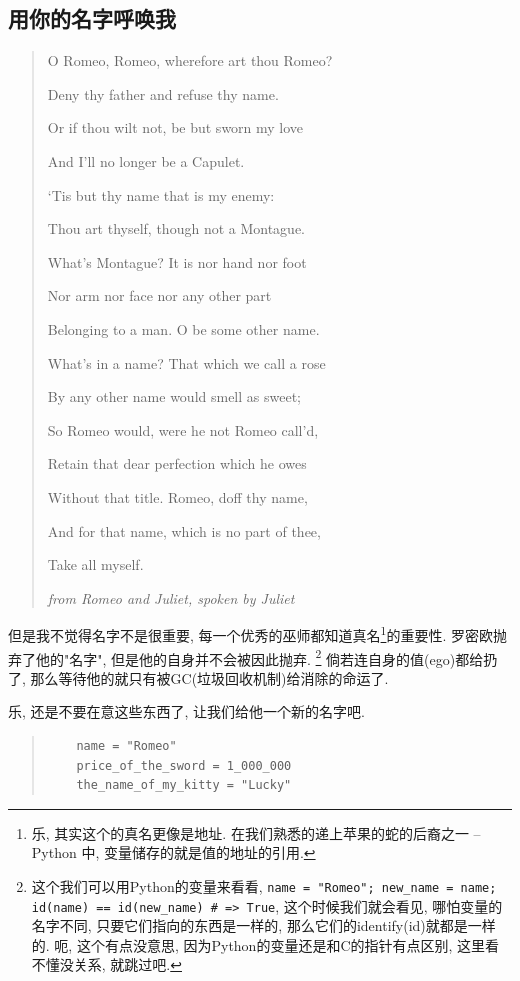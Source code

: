 \subsection{用你的名字呼唤我}
\begin{quotation}
  O Romeo, Romeo, wherefore art thou Romeo?

  Deny thy father and refuse thy name.

  Or if thou wilt not, be but sworn my love

  And I'll no longer be a Capulet.

  `Tis but thy name that is my enemy:

  Thou art thyself, though not a Montague.

  What's Montague? It is nor hand nor foot

  Nor arm nor face nor any other part

  Belonging to a man. O be some other name.

  What's in a name? That which we call a rose

  By any other name would smell as sweet;

  So Romeo would, were he not Romeo call'd,

  Retain that dear perfection which he owes

  Without that title. Romeo, doff thy name,

  And for that name, which is no part of thee,

  Take all myself.

  \emph{from Romeo and Juliet, spoken by Juliet}
\end{quotation}

但是我不觉得名字不是很重要, 每一个优秀的巫师都知道真名\footnote{乐, 其实这个的真名更像是地址. 在我们熟悉的递上苹果的蛇的后裔之一 -- Python 中, 变量储存的就是值的地址的引用. }的重要性. 罗密欧抛弃了他的"名字", 但是他的自身并不会被因此抛弃. \footnote{这个我们可以用Python的变量来看看, \texttt{name = "Romeo"; new_name = name; id(name) == id(new_name) # => True}, 这个时候我们就会看见, 哪怕变量的名字不同, 只要它们指向的东西是一样的, 那么它们的identify(id)就都是一样的. 呃, 这个有点没意思, 因为Python的变量还是和C的指针有点区别, 这里看不懂没关系, 就跳过吧. } 倘若连自身的值(ego)都给扔了, 那么等待他的就只有被GC(垃圾回收机制)给消除的命运了. 

乐, 还是不要在意这些东西了, 让我们给他一个新的名字吧. 

\begin{quotation}
  \begin{verbatim}
    name = "Romeo"
    price_of_the_sword = 1_000_000
    the_name_of_my_kitty = "Lucky"
  \end{verbatim}
\end{quotation}

